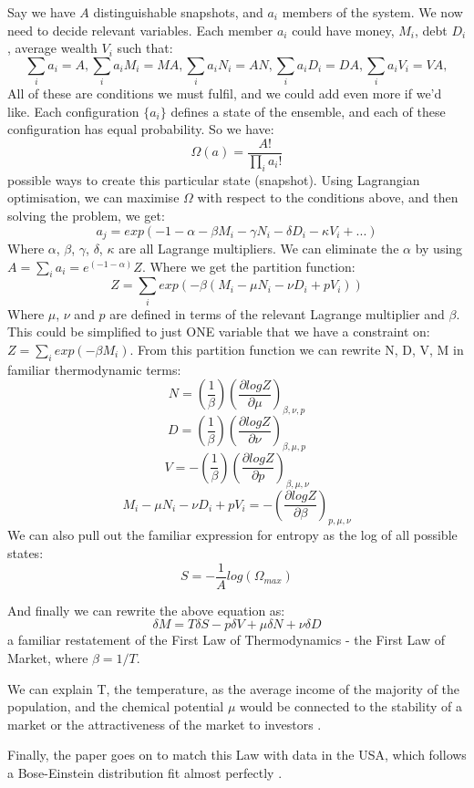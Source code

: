 \documentclass[a4paper, 12pt]{article}
\begin{document}
Say we have $A$ distinguishable snapshots, and $a_i$ members of the system. We now need to decide relevant variables. Each member $a_i$ could have money, $M_i$, debt $D_i$, average wealth $V_i$ such that:
$$ \sum_i a_i = A, \sum_i a_iM_i = MA, \sum_i a_iN_i = AN, \sum_i a_iD_i = DA, \sum_i a_iV_i = VA, $$
All of these are conditions we must fulfil, and we could add even more if we'd like.
Each configuration $\{a_i\}$ defines a state of the ensemble, and each of these configuration has equal probability. So we have: 
$$ \Omega(a)=\frac{A!}{\prod_i a_i!}  $$ possible ways to create this particular state (snapshot).
Using Lagrangian optimisation, we can maximise $\Omega$ with respect to the conditions above, and then solving the problem, we get: $$a_j = exp(-1-\alpha-\beta M_i - \gamma N_i - \delta D_i - \kappa V_i + ...) $$
Where $\alpha$, $\beta$, $\gamma$, $\delta$, $\kappa$ are all Lagrange multipliers. 
We can eliminate the $\alpha$ by using $A = \sum_i a_i = e^(-1-\alpha) Z $. Where we get the partition function:
$$ Z = \sum_i exp(-\beta(M_i-\mu N_i-\nu D_i+p V_i)) $$
Where $\mu$, $\nu$ and $p$ are defined in terms of the relevant Lagrange multiplier and $\beta$. This could be simplified to just ONE variable that we have a constraint on: $ Z= \sum_i exp(-\beta M_i)$.
From this partition function we can rewrite N, D, V, M in familiar thermodynamic terms:
$$ N = \left(\frac{1}{\beta}\right) \left(\frac{\partial log Z}{\partial \mu} \right)_{\beta, \nu, p} $$
$$ D = \left(\frac{1}{\beta}\right) \left(\frac{\partial log Z}{\partial \nu} \right)_{\beta, \mu, p} $$
$$ V = -\left(\frac{1}{\beta}\right) \left(\frac{\partial log Z}{\partial p} \right)_{\beta, \mu, \nu} $$
$$ M_i-\mu N_i-\nu D_i+p V_i = -\left(\frac{\partial log Z}{\partial \beta} \right)_{p, \mu, \nu}$$
We can also pull out the familiar expression for entropy as the log of all possible states:
$$ S = -\frac{1}{A} log(\Omega_{max})$$

And finally we can rewrite the above equation as: 
$$\delta M = T \delta S - p \delta V + \mu \delta N + \nu \delta D $$
a familiar restatement of the First Law of Thermodynamics - the First Law of Market, where $ \beta = 1/T$. 

We can explain T, the temperature, as the average income of the majority of the population, and the chemical potential $\mu$ would be connected to the stability of a market or the attractiveness of the market to investors \cite{kusmartsev}. 

Finally, the paper goes on to match this Law with data in the USA, which follows a Bose-Einstein distribution fit almost perfectly \cite{kusmartsev}.



\end{document}
